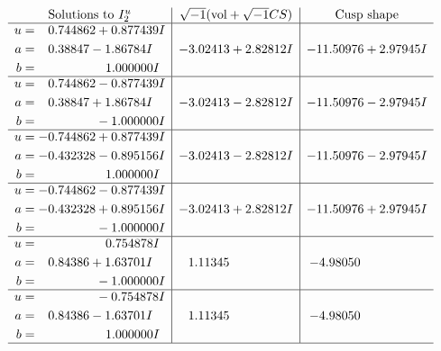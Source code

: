 \documentclass[1p]{elsarticle_modified}
\theoremstyle{definition}
\newcommand{\I}{\sqrt{-1}}
\begin{document}
$$\begin{array}{c|c|c}  
\text{Solutions to }I^u_{2}& \I (\text{vol} + \sqrt{-1}CS) & \text{Cusp shape}\\
 \hline 
\begin{aligned}
u &= \phantom{-}0.744862 + 0.877439 I \\
a &= \phantom{-}0.38847 - 1.86784 I \\
b &= \phantom{-0.000000 -}1.000000 I\end{aligned}
 & -3.02413 + 2.82812 I & -11.50976 + 2.97945 I \\ \hline\begin{aligned}
u &= \phantom{-}0.744862 - 0.877439 I \\
a &= \phantom{-}0.38847 + 1.86784 I \\
b &= \phantom{-0.000000 } -1.000000 I\end{aligned}
 & -3.02413 - 2.82812 I & -11.50976 - 2.97945 I \\ \hline\begin{aligned}
u &= -0.744862 + 0.877439 I \\
a &= -0.432328 - 0.895156 I \\
b &= \phantom{-0.000000 -}1.000000 I\end{aligned}
 & -3.02413 - 2.82812 I & -11.50976 - 2.97945 I \\ \hline\begin{aligned}
u &= -0.744862 - 0.877439 I \\
a &= -0.432328 + 0.895156 I \\
b &= \phantom{-0.000000 } -1.000000 I\end{aligned}
 & -3.02413 + 2.82812 I & -11.50976 + 2.97945 I \\ \hline\begin{aligned}
u &= \phantom{-0.000000 -}0.754878 I \\
a &= \phantom{-}0.84386 + 1.63701 I \\
b &= \phantom{-0.000000 } -1.000000 I\end{aligned}
 & \phantom{-}1.11345\phantom{ +0.000000I} & -4.98050\phantom{ +0.000000I} \\ \hline\begin{aligned}
u &= \phantom{-0.000000 } -0.754878 I \\
a &= \phantom{-}0.84386 - 1.63701 I \\
b &= \phantom{-0.000000 -}1.000000 I\end{aligned}
 & \phantom{-}1.11345\phantom{ +0.000000I} & -4.98050\phantom{ +0.000000I}\\
 \hline 
 \end{array}$$\newpage\newpage\renewcommand{\arraystretch}{1}
\end{document}

